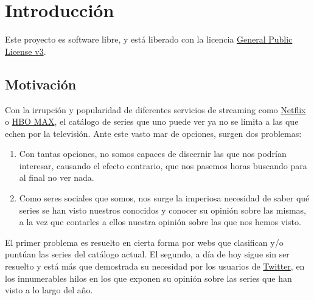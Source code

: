 \chapter{Introducción}
Este proyecto es software libre, y está liberado con la licencia
\href{http://www.gnu.org/licenses/gpl.html}{General Public License v3}\cite{gplv3}.\\

\section{Motivación}
Con la irrupción y popularidad de diferentes servicios de streaming como \href{https://netflix.com}{Netflix} o
\href{https://hbomax.com}{HBO MAX}, el catálogo de series que uno puede ver ya no se limita a las que echen por la
televisión. Ante este vasto mar de opciones, surgen dos problemas:\\

\begin{enumerate}
    \item Con tantas opciones, no somos capaces de discernir las que nos podrían interesar, causando el efecto
    contrario, que nos pasemos horas buscando para al final no ver nada.
    \item Como seres sociales que somos, nos surge la imperiosa necesidad de saber qué series se han visto nuestros
    conocidos y conocer su opinión sobre las mismas, a la vez que contarles a ellos nuestra opinión sobre las que nos
    hemos visto.
\end{enumerate}

El primer problema es resuelto en cierta forma por webs que clasifican y/o puntúan las series del catálogo actual. El
segundo, a día de hoy sigue sin ser resuelto y está más que demostrada su necesidad por los usuarios de
\href{https://twitter.com}{Twitter}, en los innumerables hilos en los que exponen su opinión sobre las series que han
visto a lo largo del año.\\

